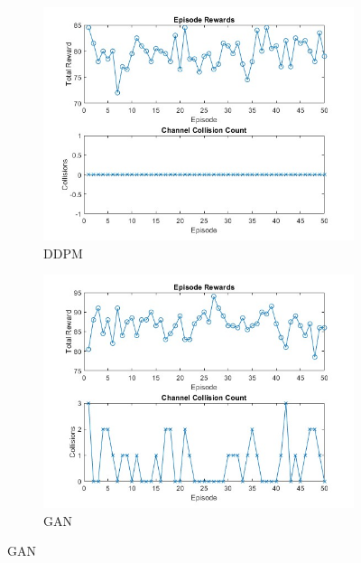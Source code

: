     
\begin{figure}[htbp]
    \centering
    \begin{subfigure}[b]{0.45\textwidth}
        \centering
        \includegraphics[width=\linewidth]{figures/collision_count_ddpm.jpg}
        \caption{DDPM}
    \end{subfigure}
    \hfill
    \begin{subfigure}[b]{0.45\textwidth}
        \centering
        \includegraphics[width=\linewidth]{figures/collision_count_gan.jpg}
        \caption{GAN}
    \end{subfigure}

    \vspace{0.5cm} %


\end{figure}

